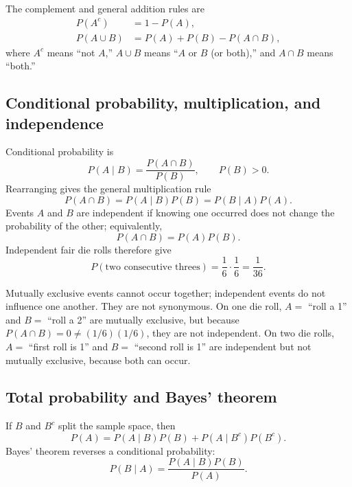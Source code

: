 \documentclass[11pt]{article}
\begin{document}
The complement and general addition rules are
\begin{align}
P(A^c)&=1-P(A),\label{eq:complement}\\
P(A\cup B)&=P(A)+P(B)-P(A\cap B),\label{eq:addition}
\end{align}
where $A^c$ means ``not $A$,'' $A\cup B$ means ``$A$ or $B$ (or both),''
and $A\cap B$ means ``both.''

\subsection{Conditional probability, multiplication, and independence}
Conditional probability is
\begin{equation}\label{eq:conditional}
P(A\mid B)=\frac{P(A\cap B)}{P(B)},\qquad P(B)>0.
\end{equation}
Rearranging gives the general multiplication rule
\begin{equation}\label{eq:multiplication}
P(A\cap B)=P(A\mid B)P(B)=P(B\mid A)P(A).
\end{equation}
Events $A$ and $B$ are independent if knowing one occurred does not change
the probability of the other; equivalently,
\begin{equation}\label{eq:independence}
P(A\cap B)=P(A)P(B).
\end{equation}
Independent fair die rolls therefore give
\[
P(\text{two consecutive threes})=\frac16\cdot\frac16=\frac1{36}.
\]

Mutually exclusive events cannot occur together; independent events do not
influence one another.  They are not synonymous.  On one die roll, $A=$
``roll a 1'' and $B=$ ``roll a 2'' are mutually exclusive, but because
$P(A\cap B)=0\ne(1/6)(1/6)$, they are not independent.  On two die rolls,
$A=$ ``first roll is 1'' and $B=$ ``second roll is 1'' are independent but
not mutually exclusive, because both can occur.

\subsection{Total probability and Bayes' theorem}
If $B$ and $B^c$ split the sample space, then
\begin{equation}\label{eq:total-prob}
P(A)=P(A\mid B)P(B)+P(A\mid B^c)P(B^c).
\end{equation}
Bayes' theorem reverses a conditional probability:
\begin{equation}\label{eq:bayes}
P(B\mid A)=\frac{P(A\mid B)P(B)}{P(A)}.
\end{equation}
\end{document}
